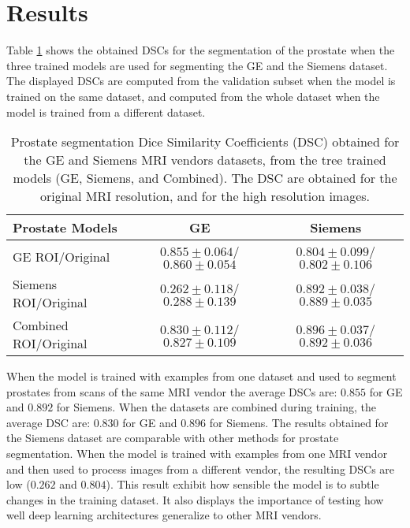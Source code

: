 \section{Results}

Table \ref{tab:res_prost} shows the obtained DSCs for the segmentation of the prostate when the three trained models are used for segmenting the GE and the Siemens dataset. The displayed DSCs are computed from the validation subset when the model is trained on the same dataset, and computed from the whole dataset when the model is trained from a different dataset. 

 \begin{table}[h]
    \caption{Prostate segmentation Dice Similarity Coefficients (DSC) obtained for the GE and Siemens MRI vendors datasets, from the
    tree trained models (GE, Siemens, and Combined). The DSC are obtained for the original MRI resolution, and for the high resolution images.}
    \begin{tabular}{lcc}
         \hline
          \textbf{Prostate Models} & \textbf{GE} & \textbf{Siemens }\\
         \hline
         GE ROI/Original & $0.855\pm0.064$/$\mathbf{0.860\pm0.054}$ & $0.804\pm0.099$/$0.802\pm0.106$ \\
         \hline
         Siemens ROI/Original & $0.262\pm0.118$/$0.288\pm0.139$ & $0.892\pm0.038$/$0.889\pm0.035$ \\
         \hline
         Combined ROI/Original & $0.830\pm0.112$/$0.827\pm0.109$ & $\mathbf{0.896\pm0.037}$/$0.892\pm0.036$\\
         \hline
    \end{tabular}
    \label{tab:res_prost}
\end{table} 
When the model is trained with examples from one dataset and used to segment prostates from scans of the same MRI vendor the average DSCs are: $0.855$ for GE and $0.892$ for Siemens. When the datasets are combined during training, the average DSC are: $0.830$ for GE and $0.896$ for Siemens.  The results obtained for the Siemens dataset are comparable with other methods for prostate segmentation. When the model is trained with examples from one MRI vendor and then used to process images from a different vendor, the resulting DSCs are low ($0.262$ and $0.804$).  This result exhibit how sensible the model is to subtle changes in the training dataset. It also displays the importance of testing how well deep learning architectures generalize to other MRI vendors.  

